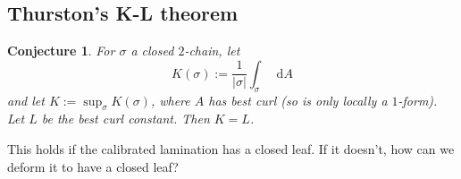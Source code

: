 \documentclass[reqno,11pt]{amsart}
\newcommand*\dif{\mathop{}\!\mathrm{d}}
\newtheorem{conjecture}[theorem]{Conjecture}
\theoremstyle{definition}
\numberwithin{equation}{section}
\begin{document}
\subsection{Thurston's K-L theorem}
\begin{conjecture}
For $\sigma$ a closed $2$-chain, let
$$K(\sigma) := \frac{1}{|\sigma|} \int_\sigma \dif A$$
and let $K := \sup_\sigma K(\sigma)$, where $A$ has best curl (so is only locally a $1$-form).
Let $L$ be the best curl constant. Then $K = L$.
\end{conjecture}

This holds if the calibrated lamination has a closed leaf.
If it doesn't, how can we deform it to have a closed leaf?



\printbibliography
\end{document}
